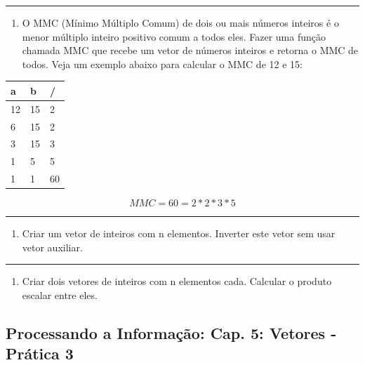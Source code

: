 \documentclass[12pt,a4paper]{article}
\renewcommand{\linethickness}{0.05em}
\providecommand{\tightlist}{%
      \setlength{\itemsep}{0pt}\setlength{\parskip}{0pt}}
\begin{document}
    \begin{center}\rule{0.5\linewidth}{\linethickness}\end{center}

\begin{enumerate}
\def\labelenumi{\arabic{enumi}.}
\setcounter{enumi}{2}
\tightlist
\item
  O MMC (Mínimo Múltiplo Comum) de dois ou mais números inteiros é o
  menor múltiplo inteiro positivo comum a todos eles. Fazer uma função
  chamada MMC que recebe um vetor de números inteiros e retorna o MMC de
  todos. Veja um exemplo abaixo para calcular o MMC de 12 e 15:
\end{enumerate}

    \begin{longtable}[]{@{}lll@{}}
\toprule
a & b & /\tabularnewline
\midrule
\endhead
12 & 15 & 2\tabularnewline
6 & 15 & 2\tabularnewline
3 & 15 & 3\tabularnewline
1 & 5 & 5\tabularnewline
1 & 1 & 60\tabularnewline
\bottomrule
\end{longtable}

\[MMC = 60 = 2*2*3*5\]

    \begin{center}\rule{0.5\linewidth}{\linethickness}\end{center}

\begin{enumerate}
\def\labelenumi{\arabic{enumi}.}
\setcounter{enumi}{3}
\tightlist
\item
  Criar um vetor de inteiros com n elementos. Inverter este vetor sem
  usar vetor auxiliar.
\end{enumerate}

    \begin{center}\rule{0.5\linewidth}{\linethickness}\end{center}

\begin{enumerate}
\def\labelenumi{\arabic{enumi}.}
\setcounter{enumi}{4}
\tightlist
\item
  Criar dois vetores de inteiros com n elementos cada. Calcular o
  produto escalar entre eles.
\end{enumerate}

    \hypertarget{processando-a-informauxe7uxe3o-cap.-5-vetores---pruxe1tica-3}{%
\subsection{Processando a Informação: Cap. 5: Vetores - Prática
3}\label{processando-a-informauxe7uxe3o-cap.-5-vetores---pruxe1tica-3}}
\end{document}
